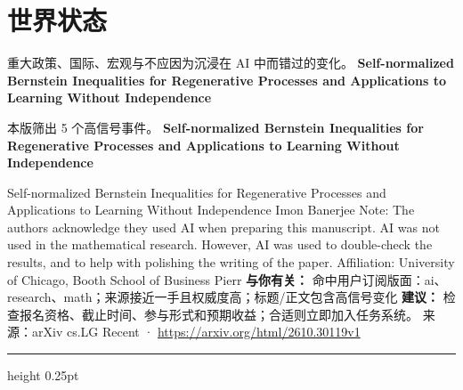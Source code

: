 \documentclass[10.5pt]{ctexart}
\begin{document}
\section*{世界状态}
{\color{ormuted} 重大政策、国际、宏观与不应因为沉浸在 AI 中而错过的变化。}
\vspace{2mm}
{\LARGE\bfseries Self-normalized Bernstein Inequalities for Regenerative Processes and Applications to Learning Without Independence}\par
\vspace{1mm}
{\color{ormuted} 本版筛出 5 个高信号事件。}
\vspace{3mm}
{\Large\bfseries Self-normalized Bernstein Inequalities for Regenerative Processes and Applications to Learning Without Independence}\par
Self-normalized Bernstein Inequalities for Regenerative Processes and Applications to Learning Without Independence Imon Banerjee Note: The authors acknowledge they used AI when preparing this manuscript. AI was not used in the mathematical research. However, AI was used to double-check the results, and to help with polishing the writing of the paper. Affiliation: University of Chicago, Booth School of Business Pierr
\textbf{与你有关：} 命中用户订阅版面：ai、research、math；来源接近一手且权威度高；标题/正文包含高信号变化
\textbf{建议：} 检查报名资格、截止时间、参与形式和预期收益；合适则立即加入任务系统。
{\footnotesize\color{ormuted} 来源：arXiv cs.LG Recent · \url{https://arxiv.org/html/2610.30119v1}}
\vspace{4mm}
\hrule height 0.25pt
\vspace{3mm}
\end{document}
